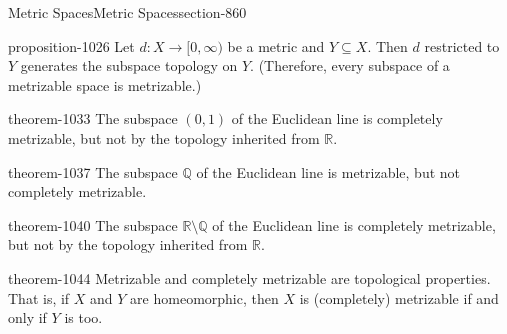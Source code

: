 \documentclass[oneside,10pt,]{article}
\newcommand{\mb}{\mathbb}
\begin{document}
\begin{sectionptx}{Metric Spaces}{}{Metric Spaces}{}{}{section-860}
\begin{proposition}{}{}{proposition-1026}
\hypertarget{p-1027}{}%
Let \(d:X\to[0,\infty)\) be a metric and \(Y\subseteq X\). Then \(d\) restricted to \(Y\) generates the subspace topology on \(Y\). (Therefore, every subspace of a metrizable space is metrizable.)%
\end{proposition}
\begin{theorem}{}{}{theorem-1033}%
\hypertarget{p-1034}{}%
The subspace \((0,1)\) of the Euclidean line is completely metrizable, but not by the topology inherited from \(\mb R\).%
\end{theorem}
\begin{theorem}{}{}{theorem-1037}%
\hypertarget{p-1038}{}%
The subspace \(\mb Q\) of the Euclidean line is metrizable, but not completely metrizable.%
\end{theorem}
\begin{theorem}{}{}{theorem-1040}%
\hypertarget{p-1041}{}%
The subspace \(\mb R\setminus\mb Q\) of the Euclidean line is completely metrizable, but not by the topology inherited from \(\mb R\).%
\end{theorem}
\begin{theorem}{}{}{theorem-1044}%
\hypertarget{p-1045}{}%
Metrizable and completely metrizable are topological properties. That is, if \(X\) and \(Y\) are homeomorphic, then \(X\) is (completely) metrizable if and only if \(Y\) is too.%
\end{theorem}
\end{sectionptx}
%
%
\typeout{************************************************}
\typeout{************************************************}
%
\end{document}
